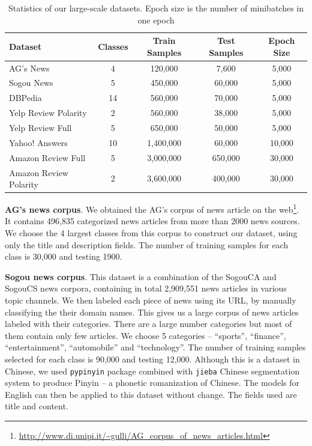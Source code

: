 \documentclass{article} %
\begin{document}
\begin{table}[ht]
  \caption{Statistics of our large-scale datasets. Epoch size is the number of minibatches in one epoch}
  \label{tab:data}
  \begin{center}
    \begin{tabular}{lcccc}
      Dataset & Classes & Train Samples & Test Samples & Epoch Size \\
      \hline
      AG's News & 4 & 120,000 & 7,600 & 5,000 \\
      Sogou News & 5 & 450,000 & 60,000 & 5,000 \\
      DBPedia & 14 & 560,000 & 70,000 & 5,000 \\
      Yelp Review Polarity & 2 & 560,000 & 38,000 & 5,000 \\
      Yelp Review Full & 5 & 650,000 & 50,000 & 5,000 \\
      Yahoo! Answers & 10 & 1,400,000 & 60,000 & 10,000 \\
      Amazon Review Full & 5 & 3,000,000 & 650,000 & 30,000 \\
      Amazon Review Polarity & 2 & 3,600,000 & 400,000 & 30,000 \\
    \end{tabular}
  \end{center}
\end{table}

\textbf{AG's news corpus}. We obtained the AG's corpus of news article on the web\footnote{\url{http://www.di.unipi.it/~gulli/AG_corpus_of_news_articles.html}}. It contains 496,835 categorized news articles from more than 2000 news sources. We choose the 4 largest classes from this corpus to construct our dataset, using only the title and description fields. The number of training samples for each class is 30,000 and testing 1900.

\textbf{Sogou news corpus}. This dataset is a combination of the SogouCA and SogouCS news corpora\cite{WZMR08}, containing in total 2,909,551 news articles in various topic channels. We then labeled each piece of news using its URL, by manually classifying the their domain names. This gives us a large corpus of news articles labeled with their categories. There are a large number categories but most of them contain only few articles. We choose 5 categories -- ``sports'', ``finance'', ``entertainment'', ``automobile'' and ``technology''. The number of training samples selected for each class is 90,000 and testing 12,000. Although this is a dataset in Chinese, we used \verb|pypinyin| package combined with \verb|jieba| Chinese segmentation system to produce Pinyin -- a phonetic romanization of Chinese. The models for English can then be applied to this dataset without change. The fields used are title and content.
\end{document}
